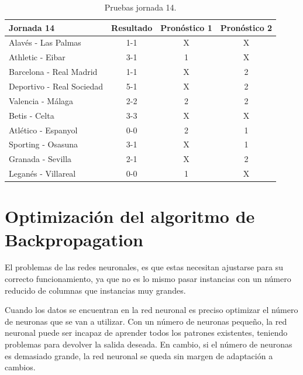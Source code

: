   \begin{table}
  \begin{center}
    \centering
	\begin{tabular}{p{5cm} c c c }
    \toprule
   	Jornada 14 & Resultado & Pronóstico 1 & Pronóstico 2\\
    \midrule
    Alavés - Las Palmas & 1-1 & \cellcolor{green!30}X & \cellcolor{green!30}X\\
    Athletic - Eibar & 3-1 & \cellcolor{green!30}1 & \cellcolor{red!30}X\\    
    Barcelona - Real Madrid & 1-1 & \cellcolor{green!30}X & \cellcolor{red!30}2\\    
    Deportivo - Real Sociedad & 5-1 & \cellcolor{red!30}X & \cellcolor{red!30}2\\    
    Valencia - Málaga & 2-2 & \cellcolor{red!30}2 & \cellcolor{red!30}2\\    
    Betis - Celta & 3-3 & \cellcolor{green!30}X & \cellcolor{green!30}X\\    
    Atlético - Espanyol & 0-0 & \cellcolor{red!30}2 & \cellcolor{red!30}1\\    
    Sporting - Osasuna & 3-1 & \cellcolor{red!30}X & \cellcolor{green!30}1\\    
	Granada - Sevilla & 2-1 & \cellcolor{red!30}X & \cellcolor{red!30}2\\    
    Leganés - Villareal & 0-0 & \cellcolor{red!30}1 & \cellcolor{green!30}X\\
	\bottomrule    
   \end{tabular}
   \caption{Pruebas jornada 14.}
   \label{tabla:jornada14}
  \end{center}
 \end{table} 

\section{Optimización del algoritmo de Backpropagation}
El problemas de las redes neuronales, es que estas necesitan ajustarse para su correcto funcionamiento, ya que no es lo mismo pasar instancias con un número reducido de columnas que instancias muy grandes.

Cuando los datos se encuentran en la red neuronal es preciso optimizar el número de neuronas que se van a utilizar. Con un número de neuronas pequeño, la red neuronal puede ser incapaz de aprender todos los patrones existentes, teniendo problemas para devolver la salida deseada. En cambio, si el número de neuronas es demasiado grande, la red neuronal se queda sin margen de adaptación a cambios.


